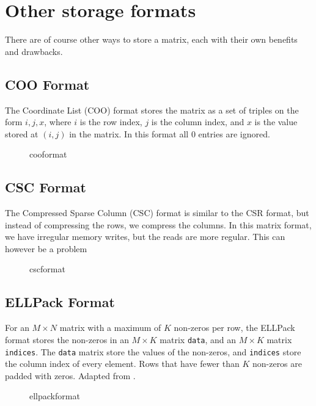 \section{Other storage formats}
There are of course other ways to store a matrix, each with their own benefits and drawbacks.

\subsection{COO Format}
The Coordinate List (COO) format stores the matrix as a set of triples on the form \(i,j,x\), where \(i\) is the row index, \(j\) is the column index, and \(x\) is the value stored at \((i,j)\) in the matrix. In this format all \(0\) entries are ignored.

\begin{figure}[H]
    \centering
    \caption{cooformat}
    \label{fig:cooformat}
\end{figure}


\subsection{CSC Format}
The Compressed Sparse Column (CSC) format is similar to the CSR format, but instead of compressing the rows, we compress the columns. In this matrix format, we have irregular memory writes, but the reads are more regular. This can however be a problem

\begin{figure}[H]
    \centering
    \caption{cscformat}
    \label{fig:cscformat}
\end{figure}

\subsection{ELLPack Format}
For an \(M \times  N\) matrix with a maximum of \(K\) non-zeros per row, the ELLPack format stores the non-zeros in an \(M \times  K\) matrix \texttt{data}, and an \(M \times  K\) matrix \texttt{indices}. The \texttt{data} matrix store the values of the non-zeros, and \texttt{indices} store the column index of every element. Rows that have fewer than \(K\) non-zeros are padded with zeros. Adapted from \cite{ellpackformat}.

\begin{figure}[ht]
    \centering
    \caption{ellpackformat}
    \label{fig:ellpackformat}
\end{figure}


